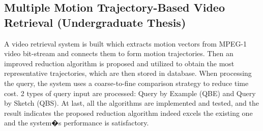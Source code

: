 \documentclass[10pt,letterpaper]{article}
\renewenvironment{itemize}{
  \begin{list}{}{
    \setlength{\leftmargin}{1.5em}
    \setlength{\itemsep}{0.25em}
    \setlength{\parskip}{0pt}
    \setlength{\parsep}{0.25em}
  }
}{
  \end{list}
}
\begin{document}

\subsection*{Multiple Motion Trajectory-Based Video Retrieval (Undergraduate Thesis)}
\begin{itemize}
\item A video retrieval system is built which extracts motion vectors from MPEG-1 video bit-stream and connects them to form motion trajectories. Then an improved reduction algorithm is proposed and utilized to obtain the most representative trajectories, which are then stored in database. When processing the query, the system uses a coarse-to-fine comparison strategy to reduce time cost. 2 types of query input are processed: Query by Example (QBE) and Query by Sketch (QBS). At last, all the algorithms are implemented and tested, and the result indicates the proposed reduction algorithm indeed excels the existing one and the system�s performance is satisfactory.
\end{itemize}
\end{document}
